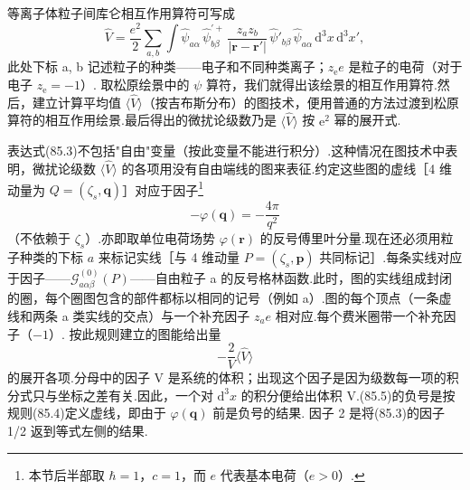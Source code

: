 等离子体粒子间库仑相互作用算符可写成
\begin{equation}
  \hat{V}=\frac{e^{2}}{2}\sum_{a,b}\int\hat{\psi}_{a\alpha}\,\hat{\psi}^{\prime +}_{b\beta}\,\frac{z_a z_b}{|\bm{r}-\bm{r}'|}\,\hat{\psi}'_{b\beta}\,\hat{\psi}_{a\alpha}\,\mathrm{d}^{3}x\,\mathrm{d}^{3}x',
\end{equation}
此处下标 a, b 记述粒子的种类——电子和不同种类离子；$z_{\mathrm{e}}e$ 是粒子的电荷（对于电子 $z_{\mathrm{e}}=-1$）. 取松原绘景中的 $\psi$ 算符，我们就得出该绘景的相互作用算符.然后，建立计算平均值 $\langle\hat{V}\rangle$（按吉布斯分布）的图技术，便用普通的方法过渡到松原算符的相互作用绘景.最后得出的微扰论级数乃是 $\langle\hat{V}\rangle$ 按 $\mathrm{e}^{2}$ 幂的展开式.

表达式(85.3)不包括"自由"变量（按此变量不能进行积分）.这种情况在图技术中表明，微扰论级数 $\langle\hat{V}\rangle$ 的各项用没有自由端线的图来表征.约定这些图的虚线［4 维动量为 $Q=(\zeta_s,\bm{q})$］对应于因子\footnote{本节后半部取 $\hbar=1$，$c=1$，而 $e$ 代表基本电荷（$e>0$）.}
\begin{equation}
  -\varphi(\bm{q})=-\frac{4\pi}{q^{2}}
\end{equation}
（不依赖于 $\zeta_s$）.亦即取单位电荷场势 $\varphi(\bm{r})$ 的反号傅里叶分量.现在还必须用粒子种类的下标 $a$ 来标记实线［与 4 维动量 $P=(\zeta_s,\bm{p})$ 共同标记］.每条实线对应于因子——$\mathcal{G}^{(0)}_{a\alpha\beta}(P)$——自由粒子 a 的反号格林函数.此时，图的实线组成封闭的圈，每个圈图包含的部件都标以相同的记号（例如 a）.图的每个顶点（一条虚线和两条 a 类实线的交点）与一个补充因子 $z_ae$ 相对应.每个费米圈带一个补充因子（$-1$）. 按此规则建立的图能给出量
\begin{equation}
  -\frac{2}{V}\bigl\langle\hat{V}\bigr\rangle
\end{equation}
的展开各项.分母中的因子 V 是系统的体积；出现这个因子是因为级数每一项的积分式只与坐标之差有关.因此，一个对 $\mathrm{d}^{3}x$ 的积分便给出体积 V.(85.5)的负号是按规则(85.4)定义虚线，即由于 $\varphi(\bm{q})$ 前是负号的结果. 因子 2 是将(85.3)的因子 1/2 返到等式左侧的结果.

